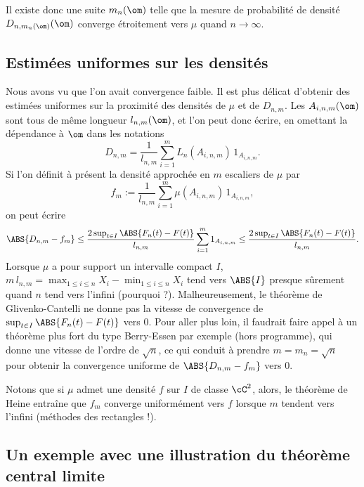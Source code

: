Il existe donc une suite $m_n(\om)$ telle que la mesure de probabilité de
densité $D_{n,m_n(\om)}(\om)$ converge étroitement vers $\mu$ quand
$n\to\infty$.

\subsection{Estimées uniformes sur les densités}


Nous avons vu que l'on avait convergence faible. Il est plus délicat d'obtenir
des estimées uniformes sur la proximité des densités de $\mu$ et de $D_{n,m}$.
Les $A_{i,n,m}(\om)$ sont tous de même longueur $l_{n,m}(\om)$, et l'on peut
donc écrire, en omettant la dépendance à $\om$ dans les notations
$$
D_{n,m}=\frac{1}{l_{n,m}} \sum_{i=1}^m L_n(A_{i,n,m})\,1_{A_{i,n,m}}.
$$
Si l'on définit à présent la densité approchée en $m$ escaliers de $\mu$
par
$$
 f_m:=\frac{1}{l_{n,m}} \sum_{i=1}^m \mu(A_{i,n,m})\,1_{A_{i,n,m}},
$$
on peut écrire
$$
\ABS{D_{n,m}-f_m} 
\leq \frac{2\sup_{t\in I} \ABS{F_n(t)-F(t)}}{l_{n,m}} 
     \sum_{i=1}^m 1_{A_{i,n,m}}
\leq \frac{2\sup_{t\in I}\ABS{F_n(t)-F(t)}}{l_{n,m}}.
$$
Lorsque $\mu$ a pour support un intervalle compact $I$,
$m\,l_{n,m}=\max_{1\leq i\leq n} X_i-\min_{1\leq i\leq n} X_i$ tend vers
$\ABS{I}$ presque sûrement quand $n$ tend vers l'infini (pourquoi ?).
Malheureusement, le théorème de Glivenko-Cantelli ne donne pas la vitesse de
convergence de $\sup_{t\in I} \ABS{F_n(t)-F(t)}$ vers $0$. Pour aller plus
loin, il faudrait faire appel à un théorème plus fort du type Berry-Essen par
exemple (hors programme), qui donne une vitesse de l'ordre de $\sqrt{n}$, ce
qui conduit à prendre $m=m_n=\sqrt{n}$ pour obtenir la convergence uniforme de
$\ABS{D_{n,m}-f_m}$ vers $0$.

Notons que si $\mu$ admet une densité $f$ sur $I$ de classe $\cC^2$, alors, le
théorème de Heine entraîne que $f_{m}$ converge uniformément vers $f$
lorsque $m$ tendent vers l'infini (méthodes des rectangles !).

\subsection{Un exemple avec une illustration du théorème central limite}

